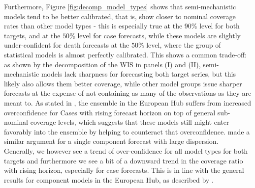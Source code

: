 Furthermore, Figure \ref{fig:decomp_model_types} shows that semi-mechanistic models tend to be better calibrated, that is, show closer to nominal coverage rates than other model types - this is especially true at the $90\%$ level for both targets, and at the $50\%$ level for case forecasts, while these models are slightly under-confident for death forecasts at the $50\%$ level, where the group of statistical models is almost perfectly calibrated. This shows a common trade-off: as shown by the decomposition of the WIS in panels (I) and (II), semi-mechanistic models lack sharpness for forecasting both target series, but this likely also allows them better coverage, while other model groups issue sharper forecasts at the expense of not containing as many of the observations as they are meant to. As stated in \cite{sherratt_european_2022}, the ensemble in the European Hub suffers from increased overconfidence for Cases with rising forecast horizon on top of general sub-nominal coverage levels, which suggests that these models still might enter favorably into the ensemble by helping to counteract that overconfidence. \cite{bracher_evaluating_2021} made a similar argument for a single component forecast with large dispersion.\\ %
Generally, we however see a trend of over-confidence for all model types for both targets and furthermore we see a bit of a downward trend in the coverage ratio with rising horizon, especially for case forecasts. This is in line with the general results for component models in the European Hub, as described by \cite{sherratt_european_2022}.
